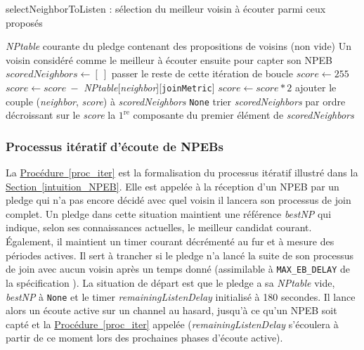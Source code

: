 \documentclass[]{report}
\newcommand{\wordlink}[2]{\hyperref[#2]{#1~\ref{#2}}}
\begin{document}
\begin{algorithm}[!h]
\caption{selectNeighborToListen : sélection du meilleur voisin à écouter parmi ceux proposés}
\begin{algorithmic}[1]
\Require \textit{NPtable} courante du pledge contenant des propositions de voisins (non vide)
\Ensure Un voisin considéré comme le meilleur à écouter ensuite pour capter son NPEB
\State $scoredNeighbors \leftarrow [\ ]$
\State passer le reste de cette itération de boucle
\Else
\State $score \leftarrow 255$
\State $score \leftarrow score\ - $ \textit{NPtable}[\textit{neighbor}][\texttt{joinMetric}]
\State $score \leftarrow score * 2$
\EndIf
\State ajouter le couple (\textit{neighbor}, \textit{score}) à \textit{scoredNeighbors}
\EndIf
\EndFor
{}
\State\Return \texttt{None}
\EndIf
\State trier \textit{scoredNeighbors} par ordre décroissant sur le \textit{score}
\State\Return la $1^{\text{re}}$ composante du premier élément de \textit{scoredNeighbors}
\end{algorithmic}
\label{proc_listen}
\end{algorithm}


\subsubsection{Processus itératif d'écoute de NPEBs}

La \wordlink{Procédure}{proc_iter} est la formalisation du processus itératif illustré dans la \wordlink{Section}{intuition_NPEB}. Elle est appelée à la réception d'un NPEB par un pledge qui n'a pas encore décidé avec quel voisin il lancera son processus de join complet. Un pledge dans cette situation maintient une référence \textit{bestNP} qui indique, selon ses connaissances actuelles, le meilleur candidat courant. Également, il maintient un timer courant décrémenté au fur et à mesure des périodes actives. Il sert à trancher si le pledge n'a lancé la suite de son processus de join avec aucun voisin après un temps donné (assimilable à \texttt{MAX\_EB\_DELAY} de la spécification \cite{rfc8180}). La situation de départ est que le pledge a sa \textit{NPtable} vide, \textit{bestNP} à \texttt{None} et le timer \textit{remainingListenDelay} initialisé à 180 secondes. Il lance alors un écoute active sur un channel au hasard, jusqu'à ce qu'un NPEB soit capté et la \wordlink{Procédure}{proc_iter} appelée (\textit{remainingListenDelay} s'écoulera à partir de ce moment lors des prochaines phases d'écoute active).\\
\end{document}
